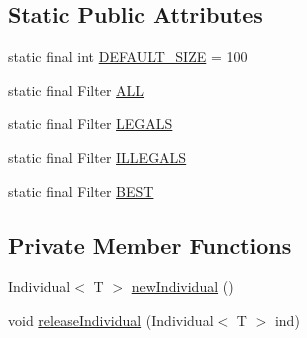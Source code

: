 \subsection*{Static Public Attributes}
\begin{DoxyCompactItemize}
\item 
static final int \hyperlink{classjenes_1_1population_1_1_population_3_01_t_01extends_01_chromosome_01_4_aada0b23838115e85378efcd67c1904e3}{D\-E\-F\-A\-U\-L\-T\-\_\-\-S\-I\-Z\-E} = 100
\item 
static final Filter \hyperlink{classjenes_1_1population_1_1_population_3_01_t_01extends_01_chromosome_01_4_a5cfea1b7e0a14171b85d3ae7460f0723}{A\-L\-L}
\item 
static final Filter \hyperlink{classjenes_1_1population_1_1_population_3_01_t_01extends_01_chromosome_01_4_a99a629869951da716c9efc8be2fdbb70}{L\-E\-G\-A\-L\-S}
\item 
static final Filter \hyperlink{classjenes_1_1population_1_1_population_3_01_t_01extends_01_chromosome_01_4_acbb46d951b86374304f72246d3142bce}{I\-L\-L\-E\-G\-A\-L\-S}
\item 
static final Filter \hyperlink{classjenes_1_1population_1_1_population_3_01_t_01extends_01_chromosome_01_4_abf7824fc3827456cc071a313586adf20}{B\-E\-S\-T}
\end{DoxyCompactItemize}
\subsection*{Private Member Functions}
\begin{DoxyCompactItemize}
\item 
Individual$<$ T $>$ \hyperlink{classjenes_1_1population_1_1_population_3_01_t_01extends_01_chromosome_01_4_a1329c606c954faacb9e98bcb5fde7061}{new\-Individual} ()
\item 
void \hyperlink{classjenes_1_1population_1_1_population_3_01_t_01extends_01_chromosome_01_4_ad477608ecb6dd9919a1c13f3a8dae2d7}{release\-Individual} (Individual$<$ T $>$ ind)
\end{DoxyCompactItemize}
